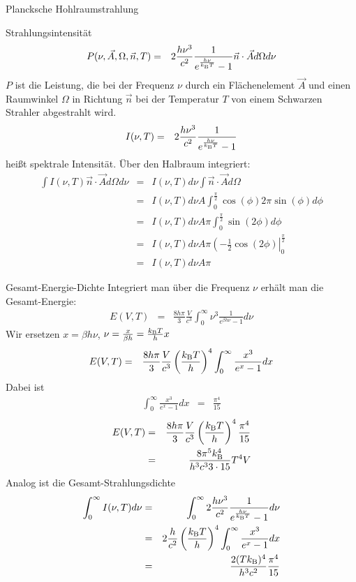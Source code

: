 \begin{chapter}{\titlestr}
\begin{section}{Plancksche Hohlraumstrahlung}
\begin{subsection}{Strahlungsintensität}
\begin{eqnarray*}
P(\nu,\vec{A},\Omega,\vec{n},T) &=& 2\frac{h\nu^3}{c^2}\frac{1}{e^\frac{h\nu}{k_{\mathrm{B}} T}-1}\vec{n}\cdot\vec{A}d\Omega d\nu
\end{eqnarray*}
$P$ ist die Leistung, die bei der Frequenz $\nu$ durch ein Flächenelement $\vec{A}$ und einen Raumwinkel $\Omega$ in Richtung $\vec{n}$ bei der Temperatur $T$ von einem Schwarzen Strahler abgestrahlt wird.
\begin{eqnarray*}
I(\nu,T) &=& 2\frac{h\nu^3}{c^2}\frac{1}{e^\frac{h\nu}{k_{\mathrm{B}} T}-1}
\end{eqnarray*}
heißt spektrale Intensität. Über den Halbraum integriert:
\begin{eqnarray*}
\int I(\nu,T) \vec{n}\cdot\vec{A}d\Omega d\nu
&=& I(\nu,T)d\nu \int \vec{n}\cdot\vec{A}d\Omega \\
&=& I(\nu,T)d\nu A\int_0^\frac{\pi}{2} \cos(\phi)2\pi\sin(\phi) d\phi \\
&=& I(\nu,T)d\nu A\pi\int_0^\frac{\pi}{2} \sin(2\phi) d\phi \\
&=& I(\nu,T)d\nu A\pi\left(-\frac{1}{2}\cos(2\phi)\right|_0^\frac{\pi}{2}\\
&=& I(\nu,T)d\nu A\pi
\end{eqnarray*}


\end{subsection}

\begin{subsection}{Gesamt-Energie-Dichte}
Integriert man über die Frequenz $\nu$ erhält man die Gesamt-Energie:
\begin{eqnarray*}
E(V,T) &=& \frac{8h\pi}{3}\frac{V}{c^3} \int_0^\infty\nu^3 \frac{1}{e^{\beta h\nu}-1}d\nu
\end{eqnarray*}
Wir ersetzen $x=\beta h\nu$, $\nu=\frac{x}{\beta h}=\frac{k_{\mathrm{B}} T}{h}x$
\begin{eqnarray*}
E(V,T) &=& \frac{8h\pi}{3}\frac{V}{c^3} \left(\frac{k_{\mathrm{B}} T}{h}\right)^4\int_0^\infty  \frac{x^3}{e^x-1}dx
\end{eqnarray*}
Dabei ist
\begin{eqnarray*}
\int_0^\infty  \frac{x^3}{e^x-1}dx &=& \frac{\pi^4}{15}
\end{eqnarray*}
\begin{eqnarray*}
E(V,T) &=& \frac{8h\pi}{3}\frac{V}{c^3} \left(\frac{k_{\mathrm{B}} T}{h}\right)^4\frac{\pi^4}{15}\\
&=& \frac{8\pi^5k_{\mathrm{B}}^4}{h^3c^3 3\cdot 15}T^4V
\end{eqnarray*}
Analog ist die Gesamt-Strahlungsdichte
\begin{eqnarray*}
\int_0^\infty I(\nu,T)d\nu &=& \int_0^\infty 2\frac{h\nu^3}{c^2}\frac{1}{e^\frac{h\nu}{k_{\mathrm{B}} T}-1}d\nu\\
&=& 2\frac{h}{c^2}\left(\frac{k_{\mathrm{B}} T}{h}\right)^4\int_0^\infty \frac{x^3}{e^x-1}dx\\
&=& \frac{2(Tk_{\mathrm{B}})^4}{h^3c^2}\frac{\pi^4}{15}
\end{eqnarray*}


\end{subsection}
\end{section}
\end{chapter}

